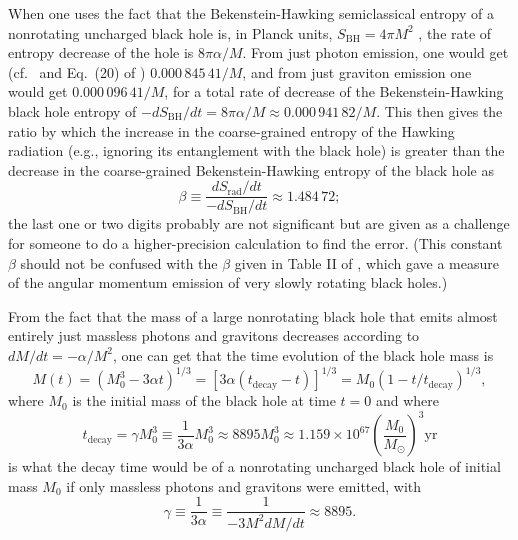 \documentclass[12pt]{article}
\begin{document}
When one uses the fact that the Bekenstein-Hawking semiclassical entropy \cite{Bekenstein:1972tm,Bekenstein:1973ur,Hawking:1974sw} of a nonrotating uncharged black hole is, in Planck units, $S_\mathrm{BH} = 4\pi M^2$ \cite{Hawking:1974sw}, the rate of entropy decrease of the hole is $8\pi\alpha/M$.  From just photon emission, one would get (cf.\ \cite{Page:1983ug} and Eq.\ (20) of \cite{Page:2006my}) $0.000\,845\,41/M$, and from just graviton emission one would get $0.000\,096\,41/M$, for a total rate of decrease of the Bekenstein-Hawking black hole entropy of $-dS_\mathrm{BH}/dt = 8\pi\alpha/M \approx 0.000\,941\,82/M$.  This then gives the ratio by which the increase in the coarse-grained entropy of the Hawking radiation (e.g., ignoring its entanglement with the black hole) is greater than the decrease in the coarse-grained Bekenstein-Hawking entropy of the black hole as
\begin{equation}
\beta \equiv \frac{dS_\mathrm{rad}/dt}{-dS_\mathrm{BH}/dt} \approx 1.484\,72;
\label{entropy-coefficient}
\end{equation}
the last one or two digits probably are not significant but are given as a challenge for someone to do a higher-precision calculation to find the error. (This constant $\beta$ should not be confused with the $\beta$ given in Table II of \cite{Page:1976ki}, which gave a measure of the angular momentum emission of very slowly rotating black holes.)

From the fact that the mass of a large nonrotating black hole that emits almost entirely just massless photons and gravitons decreases according to $dM/dt = -\alpha/M^2$, one can get that the time evolution of the black hole mass is
\begin{equation}
M(t) = (M_0^3 - 3\alpha t)^{1/3} = [3\alpha(t_\mathrm{decay} - t)]^{1/3}
     = M_0(1 - t/t_\mathrm{decay})^{1/3},
\label{mass-evolution}
\end{equation}
where $M_0$ is the initial mass of the black hole at time $t=0$ and where
\begin{equation}
t_\mathrm{decay} = \gamma M_0^3 \equiv \frac{1}{3\alpha}M_0^3 \approx 8895 M_0^3 \approx 1.159\times 10^{67}\left(\frac{M_0}{M_\odot}\right)^3\mathrm{yr}
\label{decay-time}
\end{equation}
is what the decay time would be of a nonrotating uncharged black hole of initial mass $M_0$ if only massless photons and gravitons were emitted, with
\begin{equation}
\gamma \equiv \frac{1}{3\alpha} \equiv \frac{1}{-3M^2 dM/dt} \approx 8895.
\label{decay-coefficient}
\end{equation}
\end{document}
